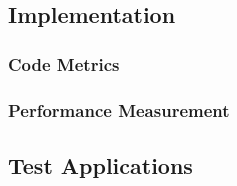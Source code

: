 \subsection{Implementation}
	\subsubsection{Code Metrics}
	\subsubsection{Performance Measurement}
	
\subsection{Test Applications}